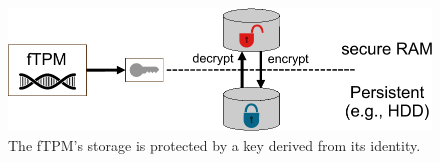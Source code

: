 \begin{figure}[htpb]
  \centering
  \includegraphics[width=0.8\linewidth]{figures/storage-encryption.pdf}
  \caption{The fTPM's storage is protected by a key derived from its identity.}\label{fig:storage-encryption}
\end{figure}
